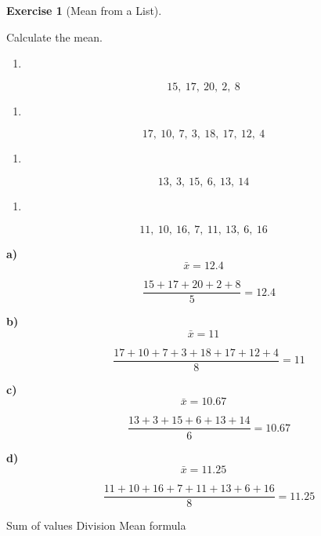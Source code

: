 \documentclass[
  letterpaper,
  DIV=11,
  numbers=noendperiod]{scrreprt}
\providecommand{\tightlist}{%
  \setlength{\itemsep}{0pt}\setlength{\parskip}{0pt}}
\theoremstyle{definition}
\newtheorem{exercise}{Exercise}[chapter]
\theoremstyle{remark}
\begin{document}
\begin{exercise}[Mean from a
List]\protect\hypertarget{exr-avg-1}{}\label{exr-avg-1}

Calculate the mean.

\begin{enumerate}
\def\labelenumi{\alph{enumi})}
\tightlist
\item
\end{enumerate}

\[15,\ 17,\ 20,\ 2,\ 8\]

\begin{enumerate}
\def\labelenumi{\alph{enumi})}
\setcounter{enumi}{1}
\tightlist
\item
\end{enumerate}

\[17,\ 10,\ 7,\ 3,\ 18,\ 17,\ 12,\ 4\]

\begin{enumerate}
\def\labelenumi{\alph{enumi})}
\setcounter{enumi}{2}
\tightlist
\item
\end{enumerate}

\[13,\ 3,\ 15,\ 6,\ 13,\ 14\]

\begin{enumerate}
\def\labelenumi{\alph{enumi})}
\setcounter{enumi}{3}
\tightlist
\item
\end{enumerate}

\[11,\ 10,\ 16,\ 7,\ 11,\ 13,\ 6,\ 16\]

\begin{tcolorbox}[enhanced jigsaw, opacitybacktitle=0.6, coltitle=black, arc=.35mm, colframe=quarto-callout-tip-color-frame, colback=white, bottomrule=.15mm, left=2mm, colbacktitle=quarto-callout-tip-color!10!white, titlerule=0mm, opacityback=0, title=\textcolor{quarto-callout-tip-color}{\faLightbulb}\hspace{0.5em}{🔍 View Solution}, leftrule=.75mm, breakable, rightrule=.15mm, bottomtitle=1mm, toptitle=1mm, toprule=.15mm]

\textbf{a)} \[\bar{x} = 12.4\]

\[\quad \dfrac{15+17+20+2+8}{5} = 12.4\]

\textbf{b)} \[\bar{x} = 11\]

\[\quad \dfrac{17+10+7+3+18+17+12+4}{8} = 11\]

\textbf{c)} \[\bar{x} = 10.67\]

\[\quad \dfrac{13+3+15+6+13+14}{6} = 10.67\]

\textbf{d)} \[\bar{x} = 11.25\]

\[\quad \dfrac{11+10+16+7+11+13+6+16}{8} = 11.25\]

\end{tcolorbox}

{Sum of values} {Division} {Mean formula}

\end{exercise}
\end{document}
